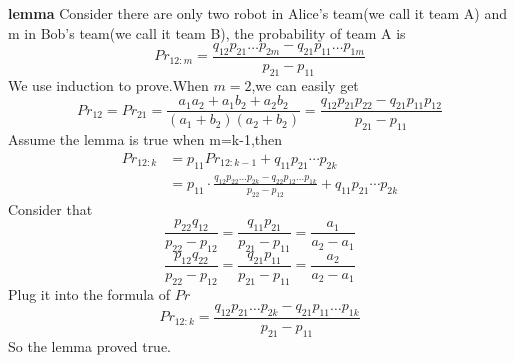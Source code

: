 \documentclass{article} %
\begin{document}
    \textbf{lemma} Consider there are only two robot in Alice's team(we call it team A) and m in Bob's team(we call it team B), the probability of team A is
    \begin{equation}
     Pr_{12:m}=\frac{q_{12}p_{21}\dots p_{2m}-q_{21}p_{11}\dots p_{1m}}{p_{21}-p_{11}}
    \end{equation}
    We use induction to prove.When $m=2$,we can easily get
    \begin{equation}
    Pr_{12}=Pr_{21}=\frac{a_1a_2+a_1b_2+a_2b_2}{(a_1+b_2)(a_2+b_2)}=\frac{q_{12}p_{21}p_{22}-q_{21}p_{11}p_{12}}{p_{21}-p_{11}}
    \end{equation}
    Assume the lemma is true when m=k-1,then
    \begin{equation}
    \begin{aligned}
    Pr_{12:k}&=p_{11}Pr_{12:k-1}+q_{11}p_{21}\cdots p_{2k}\\
    		 &=p_{11}\cdot \frac{q_{12}p_{22}\dots p_{2k}-q
    		 	_{22}p_{12}\dots p_{1k}}{p_{22}-p_{12}}+q_{11}p_{21}\cdots p_{2k}
    \end{aligned}
    \end{equation}
    Consider that
    $$
    \frac{p_{22}q_{12}}{p_{22}-p_{12}}=\frac{q_{11}p_{21}}{p_{21}-p_{11}}=\frac{a_1}{a_2-a_1}
    $$
    $$
    \frac{p_{12}q_{22}}{p_{22}-p_{12}}=\frac{q_{21}p_{11}}{p_{21}-p_{11}}=\frac{a_2}{a_2-a_1}
    $$
    Plug it into the formula of $Pr$
    $$
    Pr_{12:k}=\frac{q_{12}p_{21}\dots p_{2k}-q_{21}p_{11}\dots p_{1k}}{p_{21}-p_{11}}
    $$
    So the lemma proved true.\\
\end{document}
